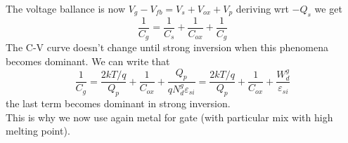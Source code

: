 The voltage ballance is now $V_g-V_{fb}=V_s+V_{ox}+V_p$ deriving wrt $-Q_s$ we get 
\begin{equation}
\frac{1}{C_{g}}=\frac{1}{C_{s}}+\frac{1}{C_{ox}}+\frac{1}{C_{g}}
\end{equation}
The C-V curve doesn't change until strong inversion when this phenomena becomes dominant. We can write that 
\begin{equation}
\frac{1}{C_g}=\frac{2kT/q}{Q_p}+\frac{1}{C_{ox}}+\frac{Q_p}{qN_d^{g}\varepsilon_{si}}=\frac{2kT/q}{Q_p}+\frac{1}{C_{ox}}+\frac{W_d^g}{\varepsilon_{si}}
\end{equation}
the last term becomes dominant in strong inversion.\\
This is why we now use again metal for gate (with particular mix with high melting point).\\
































